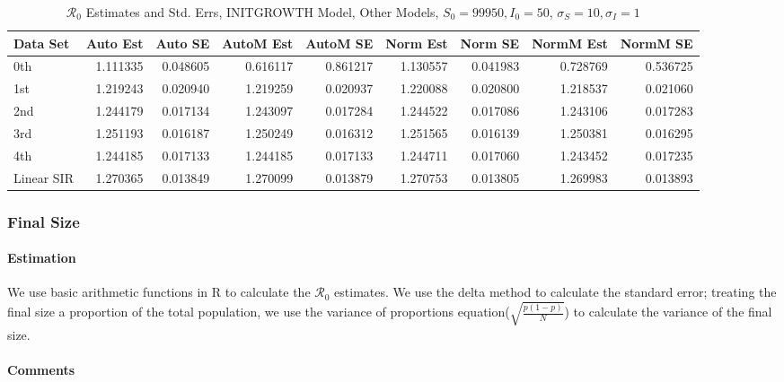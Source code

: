 \documentclass[12pt]{article}
\newcommand{\rr}{\ensuremath{\mathcal{R}_0}}
\begin{document}
\begin{table}[H]
	
	\caption{$\rr$ Estimates and Std. Errs, INITGROWTH Model,
		Other Models, $S_0 = 99950, I_0 = 50$, 
		$\sigma_S = 10, \sigma_I = 1$}
	\begin{footnotesize}
		\hskip -1cm
	\begin{tabular}{l|r|r|r|r|r|r|r|r}
		\hline
		Data Set & Auto Est & Auto SE & AutoM Est & AutoM SE & Norm Est & Norm SE & NormM Est & NormM SE\\
		\hline
		0th & 1.111335 & 0.048605 & 0.616117 & 0.861217 & 1.130557 & 0.041983 & 0.728769 & 0.536725\\
		\hline
		1st & 1.219243 & 0.020940 & 1.219259 & 0.020937 & 1.220088 & 0.020800 & 1.218537 & 0.021060\\
		\hline
		2nd & 1.244179 & 0.017134 & 1.243097 & 0.017284 & 1.244522 & 0.017086 & 1.243106 & 0.017283\\
		\hline
		3rd & 1.251193 & 0.016187 & 1.250249 & 0.016312 & 1.251565 & 0.016139 & 1.250381 & 0.016295\\
		\hline
		4th & 1.244185 & 0.017133 & 1.244185 & 0.017133 & 1.244711 & 0.017060 & 1.243452 & 0.017235\\
		\hline
		Linear SIR & 1.270365 & 0.013849 & 1.270099 & 0.013879 & 1.270753 & 0.013805 & 1.269983 & 0.013893\\
		\hline
	\end{tabular}
\end{footnotesize}
\end{table}

\subsubsection{Final Size}

\paragraph{Estimation}

We use basic arithmetic functions in R to calculate the $\rr$ estimates. We use the delta method to calculate the standard error; treating the final size a proportion of the total population, we use the variance of proportions equation($ \sqrt{\frac{p(1-p)}{N}}$) to calculate the variance of the final size.

\paragraph{Comments}
\end{document}
